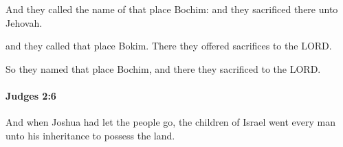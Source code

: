			\begin{versebox}
					\item[BHS] 
					\item[ASV] And they called the name of that place Bochim: and they sacrificed there unto Jehovah.
					\item[NIV] and they called that place Bokim. There they offered sacrifices to the LORD.
					\item[NRSV] So they named that place Bochim, and there they sacrificed to the LORD.
			\end{versebox}

		\paragraph{Judges 2:6} %
			\label{JUDGES-2-6}

			And when Joshua had let the people go, the children of Israel went every man unto his inheritance to possess the land.

